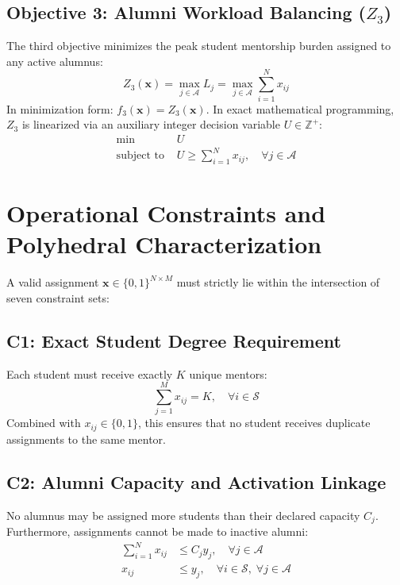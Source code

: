 \subsection{Objective 3: Alumni Workload Balancing ($Z_3$)}
The third objective minimizes the peak student mentorship burden assigned to any active alumnus:
\begin{equation}
    Z_3(\mathbf{x}) = \max_{j \in \mathcal{A}} L_j = \max_{j \in \mathcal{A}} \sum_{i=1}^N x_{ij}
    \label{eq:z3}
\end{equation}
In minimization form: $f_3(\mathbf{x}) = Z_3(\mathbf{x})$. In exact mathematical programming, $Z_3$ is linearized via an auxiliary integer decision variable $U \in \mathbb{Z}^+$:
\begin{align}
    \min \; & U \label{eq:milp_load} \\
    \text{subject to } & U \ge \sum_{i=1}^N x_{ij}, \quad \forall j \in \mathcal{A}
\end{align}

\section{Operational Constraints and Polyhedral Characterization}
A valid assignment $\mathbf{x} \in \{0, 1\}^{N \times M}$ must strictly lie within the intersection of seven constraint sets:

\subsection{C1: Exact Student Degree Requirement}
Each student must receive exactly $K$ unique mentors:
\begin{equation}
    \sum_{j=1}^M x_{ij} = K, \quad \forall i \in \mathcal{S}
    \label{eq:c1}
\end{equation}
Combined with $x_{ij} \in \{0, 1\}$, this ensures that no student receives duplicate assignments to the same mentor.

\subsection{C2: Alumni Capacity and Activation Linkage}
No alumnus may be assigned more students than their declared capacity $C_j$. Furthermore, assignments cannot be made to inactive alumni:
\begin{align}
    \sum_{i=1}^N x_{ij} &\le C_j y_j, \quad \forall j \in \mathcal{A} \label{eq:c2_cap} \\
    x_{ij} &\le y_j, \quad \forall i \in \mathcal{S}, \; \forall j \in \mathcal{A} \label{eq:c2_link}
\end{align}

